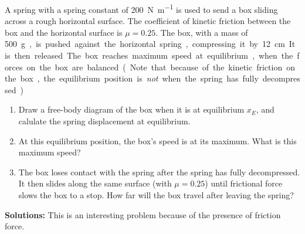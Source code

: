 \begin{example}
  A spring with a spring constant of \SI{200}{\newton\per\metre} is used to
  send a box sliding across a rough horizontal surface. The coefficient of
  kinetic friction between the box and the horizontal surface is $\mu=0.25$.
  The box, with a mass of \SI{500}\gram, is pushed against the horizontal
  spring, compressing it by \SI{12}{\centi\metre}. It is then released. The box
  reaches maximum speed at equilibrium, when the forces on the box are
  balanced. (Note that because of the kinetic friction on the box, the
  equilibrium position is \emph{not} when the spring has fully decompressed.)
  \begin{center}
  \end{center}
  \begin{enumerate}[leftmargin=15pt]%
    
  \item Draw a free-body diagram of the box when it is at equilibrium $x_E$,
    and calulate the spring displacement at equilibrium.
    
  \item At this equilibrium position, the box's speed is at its maximum.
    What is this maximum speed?

  \item The box loses contact with the spring after the spring has fully
    decompressed. It then slides along the same surface (with $\mu=0.25$)
    until frictional force slows the box to a stop. How far will the box
    travel after leaving the spring?
  \end{enumerate}
  \textbf{Solutions:} This is an interesting problem because of the presence of
  friction force.


\end{example}
